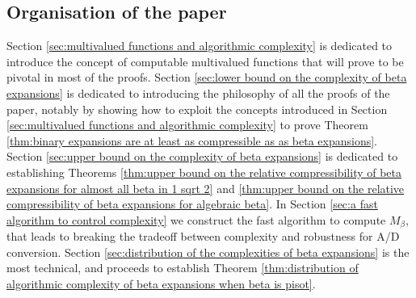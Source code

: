 	\subsection{Organisation of the paper}

	Section \ref{sec:multivalued functions and algorithmic complexity} is dedicated to introduce the concept of computable multivalued functions that will prove to be pivotal in most of the proofs. Section \ref{sec:lower bound on the complexity of beta expansions} is dedicated to introducing the philosophy of all the proofs of the paper, notably by showing how to exploit the concepts introduced in Section \ref{sec:multivalued functions and algorithmic complexity} to prove Theorem \ref{thm:binary expansions are at least as compressible as as beta expansions}. Section \ref{sec:upper bound on the complexity of beta expansions} is dedicated to establishing Theorems \ref{thm:upper bound on the relative compressibility of beta expansions for almost all beta in 1 sqrt 2} and \ref{thm:upper bound on the relative compressibility of beta expansions for algebraic beta}. In Section \ref{sec:a fast algorithm to control complexity} we construct the fast algorithm to compute $M_\beta$, that leads to breaking the tradeoff between complexity and robustness for A/D conversion. Section \ref{sec:distribution of the complexities of beta expansions} is the most technical, and proceeds to establish Theorem \ref{thm:distribution of algorithmic complexity of beta expansions when beta is pisot}. 
